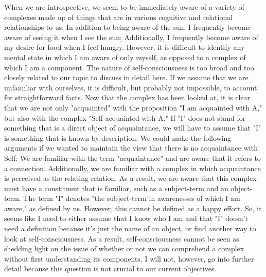 \documentclass[a4paper,12pt]{book}[2004/02/16]
\theoremstyle{ilemma}
\theoremstyle{itheorem}
\theoremstyle{iother}
\theoremstyle{icorollary}
\theoremstyle{numcorollary}
\theoremstyle{idefinition}
\begin{document}
When we are introspective, we seem to be immediately aware of a variety of complexes made up of things that are in various cognitive and relational relationships to us. In addition to being aware of the sun, I frequently become aware of seeing it when I see the sun;
Additionally, I frequently become aware of my desire for food when I feel hungry. However, it is difficult to identify any mental state in which I am aware of only myself, as opposed to a complex of which I am a component. The nature of self-consciousness is too broad and too closely related to our topic to discuss in detail here. If we assume that we are unfamiliar with ourselves, it is difficult, but probably not impossible, to account for straightforward facts. Now that the complex has been looked at, it is clear that we are not only "acquainted" with the proposition "I am acquainted with A," but also with the complex "Self-acquainted-with-A." If "I" does not stand for something that is a direct object of acquaintance, we will have to assume that "I" is something that is known by description. We could make the following arguments if we wanted to maintain the view that there is no acquaintance with Self: We are familiar with the term "acquaintance" and are aware that it refers to a connection. Additionally, we are familiar with a complex in which acquaintance is perceived as the relating relation. As a result, we are aware that this complex must have a constituent that is familiar, such as a subject-term and an object-term. The term "I" denotes "the subject-term in awarenesses of which I am aware," as defined by us. However, this cannot be defined as a happy effort. So, it seems like I need to either assume that I know who I am and that "I" doesn't need a definition because it's just the name of an object, or find another way to look at self-consciousness. As a result, self-consciousness cannot be seen as shedding light on the issue of whether or not we can comprehend a complex without first understanding its components. I will not, however, go into further detail because this question is not crucial to our current objectives.
\end{document}
